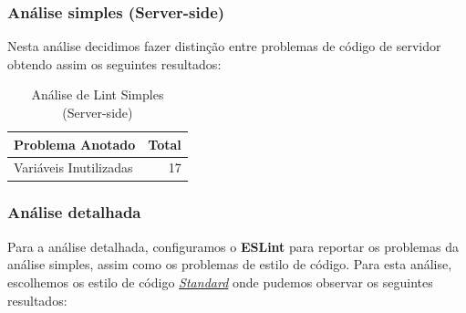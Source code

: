 \documentclass[a4paper,12pt]{article} %
\begin{document}
\newpage
\subsubsection{Análise simples (Server-side)}
Nesta análise decidimos fazer distinção entre problemas de código de servidor obtendo assim os seguintes resultados:

\vspace{1cm}
\begin{table}[!ht]
	\centering
	\begin{tabular}{|l|r|}
		\hline
		\textbf{Problema Anotado} & \textbf{Total} \\
		\hline
		Variáveis Inutilizadas & 17 \\
		\hline
	\end{tabular}
	\caption{Análise de Lint Simples (Server-side)}
\end{table}

\subsubsection{Análise detalhada}
Para a análise detalhada, configuramos o \textbf{ESLint} para reportar os problemas da análise simples, assim como os problemas de estilo de código. Para esta análise, escolhemos os estilo de código \hyperlink{https://github.com/standard/standard}{\textit{Standard}} onde pudemos observar os seguintes resultados:
\end{document}
